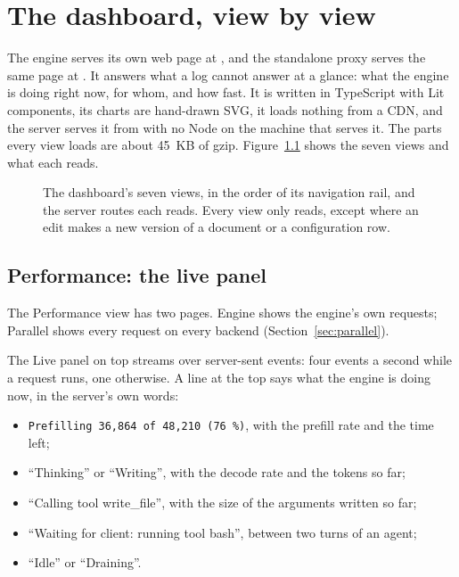 \chapter{The dashboard, view by view}\label{ch:dashboard}

The engine serves its own web page at , and the standalone proxy serves the same page at . It answers what a log cannot answer at a glance: what the engine is doing right now, for whom, and how fast. It is written in TypeScript with Lit components, its charts are hand-drawn SVG, it loads nothing from a CDN, and the server serves it from  with no Node on the machine that serves it. The parts every view loads are about 45~KB of gzip. Figure~\ref{fig:dashboard-map} shows the seven views and what each reads.

\begin{figure}[htbp]
\centering

\caption[The dashboard's views]{The dashboard's seven views, in the order of its navigation rail, and the server routes each reads. Every view only reads, except where an edit makes a new version of a document or a configuration row.}\label{fig:dashboard-map}
\end{figure}

\section{Performance: the live panel}

The Performance view has two pages. Engine shows the engine's own requests; Parallel shows every request on every backend (Section~\ref{sec:parallel}).


The Live panel on top streams  over server-sent events: four events a second while a request runs, one otherwise. A line at the top says what the engine is doing now, in the server's own words:

\begin{itemize}
\item \texttt{Prefilling 36,864 of 48,210 (76\,\%)}, with the prefill rate and the time left;
\item \enquote{Thinking} or \enquote{Writing}, with the decode rate and the tokens so far;
\item \enquote{Calling tool write\_file}, with the size of the arguments written so far;
\item \enquote{Waiting for client: running tool bash}, between two turns of an agent;
\item \enquote{Idle} or \enquote{Draining}.
\end{itemize}

